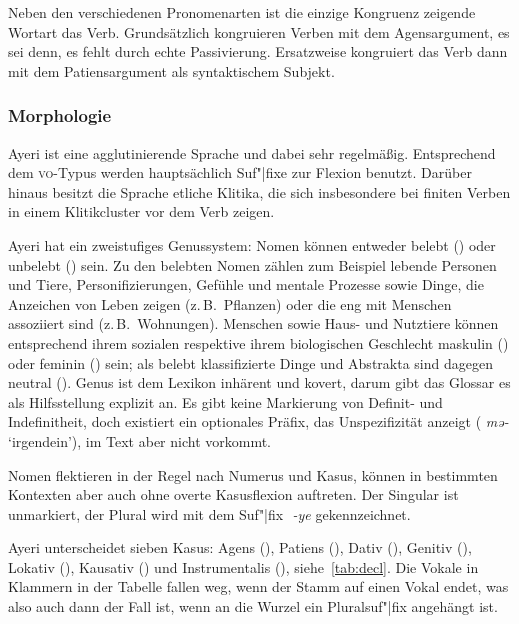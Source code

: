 \documentclass[
	12pt,
	ngerman,
]{scrartcl}
\newcommand{\zwsp}{\mbox{​}} %
\newcommand{\rayr}[2]{\zwsp\smash{{\Tagati #1}} \emph{#2}} %
\newcommand{\xayr}[3]{\zwsp\smash{\Tagati #1} \emph{#2} `#3'} %
\begin{document}
Neben den verschiedenen Pronomenarten ist die einzige Kongruenz zeigende
Wortart das Verb. Grundsätzlich kongruieren Verben mit dem Agensargument, es
sei denn, es fehlt durch echte Passivierung. Ersatzweise kongruiert das Verb
dann mit dem Patiensargument als syntaktischem Subjekt.

\subsubsection{Morphologie}

Ayeri ist eine agglutinierende Sprache und dabei sehr regelmäßig. Entsprechend
dem \textsc{vo}-Typus werden hauptsächlich Suf"|fixe zur Flexion benutzt.
Darüber hinaus besitzt die Sprache etliche Klitika, die sich insbesondere bei
finiten Verben in einem Klitikcluster vor dem Verb zeigen.

\label{subsubsec:nom}

Ayeri hat ein zweistufiges Genussystem: Nomen können entweder belebt (\Anim)
oder unbelebt (\Inan) sein. Zu den belebten Nomen zählen zum Beispiel lebende
Personen und Tiere, Personifizierungen, Gefühle und mentale Prozesse sowie
Dinge, die Anzeichen von Leben zeigen (z.\,B.~Pflanzen) oder die eng mit
Menschen assoziiert sind (z.\,B.~Wohnungen). Menschen sowie Haus- und Nutztiere
können entsprechend ihrem sozialen respektive ihrem biologischen Geschlecht
maskulin (\M) oder feminin (\F) sein; als belebt klassifizierte Dinge und
Abstrakta sind dagegen neutral (\N). Genus ist dem Lexikon inhärent und kovert,
darum gibt das Glossar es als Hilfsstellung explizit an. Es gibt keine
Markierung von Definit- und Indefinitheit, doch existiert ein optionales Präfix,
das Unspezifizität anzeigt (\xayr{me/}{mə-}{irgendein}), im Text aber nicht
vorkommt.

Nomen flektieren in der Regel nach Numerus und Kasus, können in bestimmten
Kontexten aber auch ohne overte Kasusflexion auftreten. Der Singular ist
unmarkiert, der Plural wird mit dem Suf"|fix \rayr{/ye}{-ye} gekennzeichnet.

Ayeri unterscheidet sieben Kasus: Agens (\Aarg), Patiens (\Parg), Dativ (\Dat),
Genitiv (\Gen), Lokativ (\Loc), Kausativ (\Caus) und Instrumentalis (\Ins),
siehe~\cref{tab:decl}. Die Vokale in Klammern in der Tabelle fallen weg, wenn
der Stamm auf einen Vokal endet, was also auch dann der Fall ist, wenn an die
Wurzel ein Pluralsuf"|fix angehängt ist.
\end{document}
